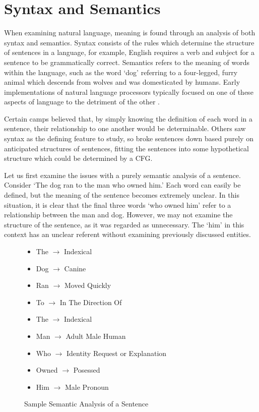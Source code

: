\section{Syntax and Semantics}

When examining natural language, meaning is found through an analysis of both syntax and semantics. Syntax consists of the rules which determine the structure of sentences in a language, for example, English requires a verb and subject for a sentence to be grammatically correct. Semantics refers to the meaning of words within the language, such as the word `dog' referring to a four-legged, furry animal which descends from wolves and was domesticated by humans. Early implementations of natural language processors typically focused on one of these aspects of language to the detriment of the other \cite{}.

Certain camps believed that, by simply knowing the definition of each word in a sentence, their relationship to one another would be determinable. Others saw syntax as the defining feature to study, so broke sentences down based purely on anticipated structures of sentences, fitting the sentences into some hypothetical structure which could be determined by a CFG.

Let us first examine the issues with a purely semantic analysis of a sentence. Consider `The dog ran to the man who owned him.' Each word can easily be defined, but the meaning of the sentence becomes extremely unclear. In this situation, it is clear that the final three words `who owned him' refer to a relationship between the man and dog. However, we may not examine the structure of the sentence, as it was regarded as unnecessary. The `him' in this context has an unclear referent without examining previously discussed entities.

\begin{center}
\begin{figure}[H]
\begin{center}

\begin{itemize}

	\item The $\rightarrow$ Indexical 
	\item Dog $\rightarrow$ Canine
	\item Ran $\rightarrow$ Moved Quickly
	\item To $\rightarrow$ In The Direction Of
	\item The $\rightarrow$ Indexical
	\item Man $\rightarrow$ Adult Male Human
	\item Who $\rightarrow$ Identity Request or Explanation
	\item Owned $\rightarrow$ Posessed
	\item Him $\rightarrow$ Male Pronoun

\end{itemize}
\end{center}
\caption{Sample Semantic Analysis of a Sentence}
\end{figure}
\end{center}

